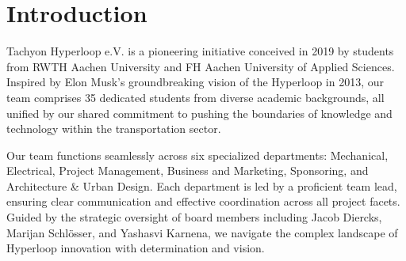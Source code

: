 \chapter{Introduction}

Tachyon Hyperloop e.V. is a pioneering initiative conceived in 2019 by students from RWTH Aachen University and FH Aachen University of Applied Sciences. Inspired by Elon Musk's groundbreaking vision of the Hyperloop in 2013, our team comprises 35 dedicated students from diverse academic backgrounds, all unified by our shared commitment to pushing the boundaries of knowledge and technology within the transportation sector.

Our team functions seamlessly across six specialized departments: Mechanical, Electrical, Project Management, Business and Marketing, Sponsoring, and Architecture \& Urban Design. Each department is led by a proficient team lead, ensuring clear communication and effective coordination across all project facets. Guided by the strategic oversight of board members including Jacob Diercks, Marijan Schlösser, and Yashasvi Karnena, we navigate the complex landscape of Hyperloop innovation with determination and vision.
\newpage
